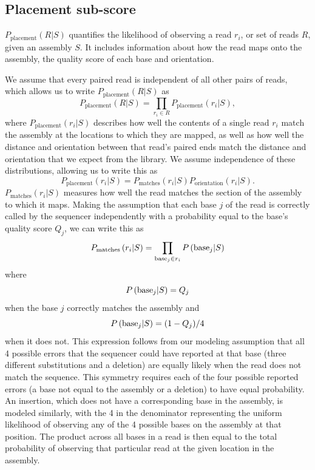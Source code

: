 \documentclass[phd,tocprelim]{cornell}
\begin{document}
\subsection{Placement sub-score} %
\label{sub:Placement sub-score}

$P_{\text{placement}}(R|S)$ quantifies the likelihood of observing a read $r_{i}$, or set of reads $R$, given an assembly $S$. It includes information about how the read maps onto the assembly, the quality score of each base and orientation.

We assume that every paired read is independent of all other pairs of reads, which allows us to write $P_{\text{placement}}(R|S)$ as
\begin{equation}
    P_{\text{placement}}(R|S) = \prod_{r_{i} \in R} P_{\text{placement}}\left(r_{i}|S\right),
\end{equation}
where $P_{\text{placement}}\left(r_{i}|S\right)$ describes how well the contents of a single read $r_{i}$ match the assembly at the locations to which they are mapped, as well as how well the distance and orientation between that read's paired ends match the distance and orientation that we expect from the library.  We assume independence of these distributions, allowing us to write this as
\begin{equation}
    P_{\text{placement}}\left(r_{i}|S\right) = P_{\text{matches}}\left(r_{i}|S\right)P_{\text{orientation}}\left(r_{i}|S\right). 
\end{equation}
$P_{\text{matches}}\left(r_{i}|S\right)$ measures how well the read matches the section of the assembly to which it maps. Making the assumption that each base $j$ of the read is correctly called by the sequencer independently with a probability equal to the base's quality score $Q_{j}$, we can write this as
\begin{equation}
    P_{\text{matches}}\left(r_{i}|S\right) = \prod_{{\rm base}_{j} \in r_{i}} P\left({\rm base}_{j}|S\right)
\end{equation}
where
\begin{equation}
    P\left({\rm base}_{j}|S\right) = Q_{j}
\end{equation}
when the base $j$ correctly matches the assembly and
\begin{equation}
    P\left({\rm base}_{j}|S\right) = (1-Q_{j})/4
\end{equation}
when it does not. This expression follows from our modeling assumption that all 4 possible errors that the sequencer could have reported at that base (three different substitutions and a deletion) are equally likely when the read does not match the sequence. This symmetry requires each of the four possible reported errors (a base not equal to the assembly or a deletion) to have equal probability. An insertion, which does not have a corresponding base in the assembly, is modeled similarly, with the 4 in the denominator representing the uniform likelihood of observing any of the 4 possible bases on the assembly at that position. The product across all bases in a read is then equal to the total probability of observing that particular read at the given location in the assembly.
\end{document}
